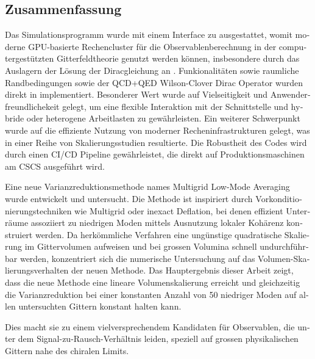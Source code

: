 \begin{otherlanguage}{ngerman}
\chapter*{Zusammenfassung}

Das Simulationsprogramm \openqxd wurde mit einem Interface zu \quda ausgestattet, womit moderne GPU-basierte Rechencluster für die Observablenberechnung in der computergestützten Gitterfeldtheorie genutzt werden können, insbesondere durch das Auslagern der Lösung der Diracgleichung an \quda.
Funkionalitäten sowie raumliche \Cstar Randbedingungen sowie der QCD+QED Wilson-Clover Dirac Operator wurden direkt in \quda implementiert.
Besonderer Wert wurde auf Vielseitigkeit und Anwenderfreundlichekeit gelegt, um eine flexible Interaktion mit der Schnittstelle und hybride oder heterogene Arbeitlasten zu gewährleisten.
Ein weiterer Schwerpunkt wurde auf die effiziente Nutzung von moderner Recheninfrastrukturen gelegt, was in einer Reihe von Skalierungsstudien resultierte.
Die Robustheit des Codes wird durch einen CI/CD Pipeline gewährleistet, die direkt auf Produktionsmaschinen am CSCS ausgeführt wird.

Eine neue Varianzreduktionsmethode names Multigrid Low-Mode Averaging wurde entwickelt und untersucht.
Die Methode ist inspiriert durch Vorkonditionierungstechniken wie Multigrid oder inexact Deflation, bei denen effizient Unterräume assoziiert zu niedrigen Moden mittels Ausnutzung lokaler Kohärenz konstruiert werden.
Da herkömmliche Verfahren eine ungünstige quadratische Skalierung im Gittervolumen aufweisen und bei grossen Volumina schnell undurchführbar werden, konzentriert sich die numerische Untersuchung auf das Volumen-Skalierungsverhalten der neuen Methode.
Das Hauptergebnis dieser Arbeit zeigt, dass die neue Methode eine lineare Volumenskalierung erreicht und gleichzeitig die Varianzreduktion bei einer konstanten Anzahl von \num{50} niedriger Moden auf allen untersuchten Gittern konstant halten kann.

Dies macht sie zu einem vielversprechendem Kandidaten für Observablen, die unter dem Signal-zu-Rausch-Verhältnis leiden, speziell auf grossen physikalischen Gittern nahe des chiralen Limits.

\end{otherlanguage}

\endgroup

\vfill